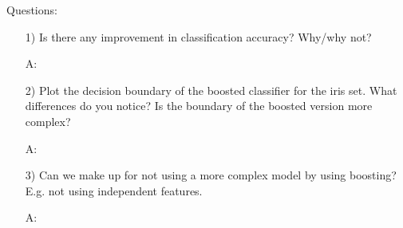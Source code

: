 \documentclass[a4paper,10pt]{article}
\begin{document}
\noindent
Questions:
\begin{itemize}
  \item[1)] Is there any improvement in classification accuracy? Why/why not?
  \item[A:]
  \item[2)] Plot the decision boundary of the boosted classifier for the iris set.
    What differences do you notice? Is the boundary of the boosted version more
    complex?
  \item[A:]
  \item[3)] Can we make up for not using a more complex model by using boosting?
    E.g. not using independent features.
  \item[A:] 
\end{itemize}
\end{document}
